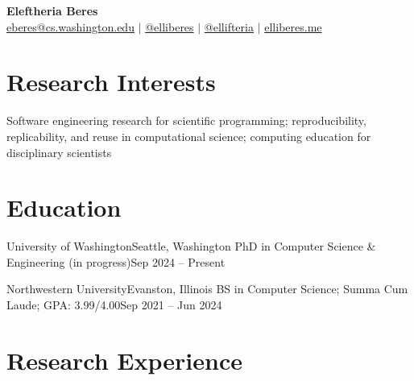 \documentclass{cv}
\begin{document}

\begin{center}
  \textbf{\Huge \bfseries Eleftheria Beres} \\ \vspace{3pt}
  \small
  \faEnvelopeO \hspace{.5pt} \href{mailto:eberes@cs.washington.edu}{eberes@cs.washington.edu}
$|$
  \faLinkedinSquare \hspace{.5pt} \href{https://www.linkedin.com/in/elliberes}{@elliberes}
$|$
  \faGithub \hspace{.5pt} \href{https://github.com/ellifteria}{@ellifteria}
$|$
  \faGlobe \hspace{.5pt} \href{https://elliberes.me}{elliberes.me}
\end{center}

\section{Research Interests}
\vspace{3pt}
\resumeSubHeadingListStart
\small{\item{Software engineering research for scientific programming; reproducibility, replicability, and reuse in computational science; computing education for disciplinary scientists \\ \vspace{3pt}}}
\resumeSubHeadingListEnd


\section{Education}
\vspace{3pt}
\resumeSubHeadingListStart
\resumeEducationHeading
{University of Washington}{Seattle, Washington}
{PhD in Computer Science \& Engineering (in progress)}{Sep 2024 – Present}

\resumeEducationHeading
{Northwestern University}{Evanston, Illinois}
{BS in Computer Science; Summa Cum Laude; GPA: 3.99/4.00}{Sep 2021 – Jun 2024}

\resumeSubHeadingListEnd



\section{Research Experience}
\vspace{3pt}
\resumeSubHeadingListStart
\end{document}
